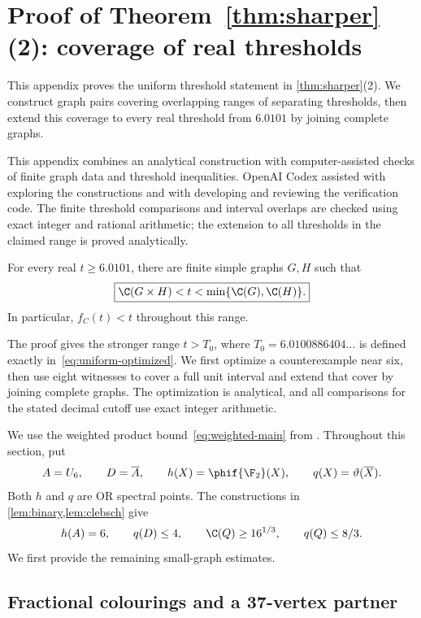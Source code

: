 \section{Proof of Theorem~\ref*{thm:sharper}(2): coverage of real thresholds}\label{sec:thresholdproof}

This appendix proves the uniform threshold statement in
\cref{thm:sharper}(2). We construct graph pairs covering overlapping
ranges of separating thresholds, then extend this coverage to every
real threshold from $6.0101$ by joining complete graphs.

This appendix combines an analytical construction with computer-assisted
checks of finite graph data and threshold inequalities. OpenAI Codex
assisted with exploring the constructions and with developing and
reviewing the verification code. The finite threshold comparisons and
interval overlaps are checked using exact integer and rational
arithmetic; the extension to all thresholds in the claimed range is
proved analytically.

\begin{theorem}
\label{thm:real-thresholds}
For every real $t\ge6.0101$, there are finite simple graphs $G,H$ such that
\[
 \boxed{\C(G\times H)<t<\min\{\C(G),\C(H)\}.}
\]
In particular, $f_C(t)<t$ throughout this range.
\end{theorem}


The proof gives the stronger range $t>T_0$, where
$T_0=6.0100886404\ldots$ is defined exactly
in~\eqref{eq:uniform-optimized}. We first optimize a counterexample
near six, then use eight witnesses to cover a full unit interval and
extend that cover by joining complete graphs. The optimization is
analytical, and all comparisons for the stated decimal cutoff use
exact integer arithmetic.

We use the weighted product bound~\eqref{eq:weighted-main} from
.
Throughout this section, put
\[
 A=U_6,\qquad D=\overline A,\qquad
 h(X)=\phif{\F_2}(X),\qquad q(X)=\vartheta(\overline X).
\]
Both $h$ and $q$ are OR spectral points. The constructions in
\cref{lem:binary,lem:clebsch} give
\[
 h(A)=6,\qquad q(D)\le4,\qquad
 \C(Q)\ge16^{1/3},\qquad q(Q)\le8/3.
\]
We first provide the remaining small-graph estimates.

\subsection{Fractional colourings and a 37-vertex partner}

